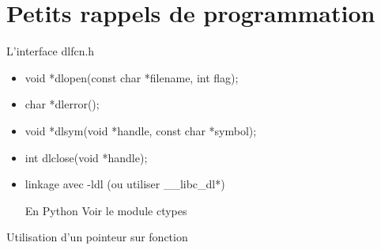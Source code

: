 \section{Petits rappels de programmation}

\frame{\tableofcontents[currentsection]}


\begin{frame}{L'interface dlfcn.h}

\begin{itemize}
	\item void *dlopen(const char *filename, int flag);
	\item char *dlerror();
	\item void *dlsym(void *handle, const char *symbol);
	\item int dlclose(void *handle);
	\item linkage avec -ldl (ou utiliser \_\_libc\_dl*)
\\

\begin{block}{En Python}
Voir le module ctypes
\end{block}

\end{itemize}

\end{frame}

\begin{frame}{Utilisation d'un pointeur sur fonction}

	

\end{frame}
